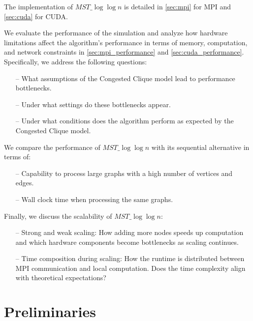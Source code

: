 \documentclass[english, 12pt, a4paper, elec, utf8, a-2b, online]{aaltothesis}
\newcommand{\mstalgo}{$MST\_\log\log{n}$}
\begin{document}
The implementation of \mstalgo{} is detailed in \cref{sec:mpi} for MPI and \cref{sec:cuda} for CUDA.

We evaluate the performance of the simulation and analyze how hardware limitations affect the algorithm's performance in terms of memory, computation, and network constraints in \cref{sec:mpi_performance} and \cref{sec:cuda_performance}. Specifically, we address the following questions:
\begin{itemize}
	\item[--] What assumptions of the Congested Clique model lead to performance bottlenecks.
	\item[--] Under what settings do these bottlenecks appear.
	\item[--] Under what conditions does the algorithm perform as expected by the Congested Clique model.
\end{itemize}

We compare the performance of \mstalgo{} with its sequential alternative in terms of:
\begin{itemize}
	\item[--] Capability to process large graphs with a high number of vertices and edges.
	\item[--] Wall clock time when processing the same graphs.
\end{itemize}

Finally, we discuss the scalability of \mstalgo{}:
\begin{itemize}
	\item[--] Strong and weak scaling: How adding more nodes speeds up computation and which hardware components become bottlenecks as scaling continues.
	\item[--] Time composition during scaling: How the runtime is distributed between MPI communication and local computation. Does the time complexity align with theoretical expectations?
\end{itemize}
\clearpage

\section{Preliminaries}
\label{sec:preliminaries}
\end{document}
